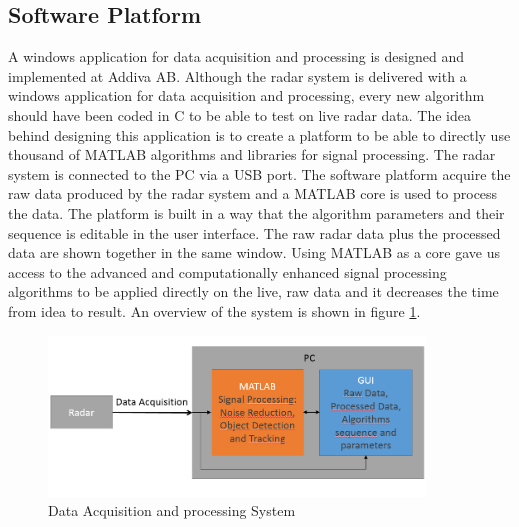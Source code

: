 \subsection{Software Platform}
A windows application for data acquisition and processing is designed and implemented at Addiva AB. Although the radar system is delivered with a windows application for data acquisition and processing, every new algorithm should have been coded in C to be able to test on live radar data. The idea behind designing this application is to create a platform to be able to directly use thousand of MATLAB algorithms and libraries for signal processing. The radar system is connected to the PC via a USB port. The software platform acquire the raw data produced by the radar system and a MATLAB core is used to process the data. The platform is built in a way that the algorithm parameters and their sequence is editable in the user interface. The raw radar data plus the processed data are shown together in the same window. Using MATLAB as a core gave us access to the advanced and computationally enhanced signal processing algorithms to be applied directly on the live, raw data and it decreases the time from idea to result. An overview of the system is shown in figure \ref{fig:system}.
\begin{figure}
    \centering
    \hspace*{-2cm} 
    \includegraphics[width=100mm]{Figures/System.PNG}
    \caption{Data Acquisition and processing System}
    \label{fig:system}
\end{figure}

